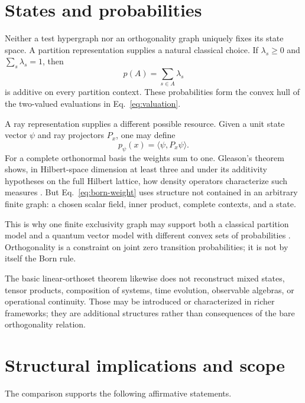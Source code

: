 \documentclass[
  aps,
  pra,
  twocolumn,
  amsmath,
  amssymb,
  longbibliography,
  nofootinbib,
  floatfix
]{revtex4-2}
\begin{document}
\section{States and probabilities}
\label{sec:probability}

Neither a test hypergraph nor an orthogonality graph uniquely fixes its state
space.  A partition representation supplies a natural classical choice.  If
$\lambda_s\ge0$ and $\sum_s\lambda_s=1$, then
\begin{equation}
  p(A)=\sum_{s\in A}\lambda_s
  \label{eq:classical-probability}
\end{equation}
is additive on every partition context.  These probabilities form the convex
hull of the two-valued evaluations in Eq.~\eqref{eq:valuation}.

A ray representation supplies a different possible resource.  Given a unit
state vector $\psi$ and ray projectors $P_x$, one may define
\begin{equation}
  p_\psi(x)=\langle\psi,P_x\psi\rangle.
  \label{eq:born-weight}
\end{equation}
For a complete orthonormal basis the weights sum to one.  Gleason's theorem
shows, in Hilbert-space dimension at least three and under its additivity
hypotheses on the full Hilbert lattice, how density operators characterize such measures
\cite{Gleason}.  But Eq.~\eqref{eq:born-weight} uses structure not contained in
an arbitrary finite graph: a chosen scalar field, inner product, complete
contexts, and a state.

This is why one finite exclusivity graph may support both a classical partition
model and a quantum vector model with different convex sets of probabilities
\cite{svozil-2018-b}.  Orthogonality is a constraint on joint zero transition
probabilities; it is not by itself the Born rule.

The basic linear-orthoset theorem likewise does not reconstruct mixed states,
tensor products, composition of systems, time evolution, observable algebras,
or operational continuity.  Those may be introduced or characterized in richer
frameworks; they are additional structures rather than consequences of the bare
orthogonality relation.

\section{Structural implications and scope}
\label{sec:claims}

The comparison supports the following affirmative statements.
\end{document}
